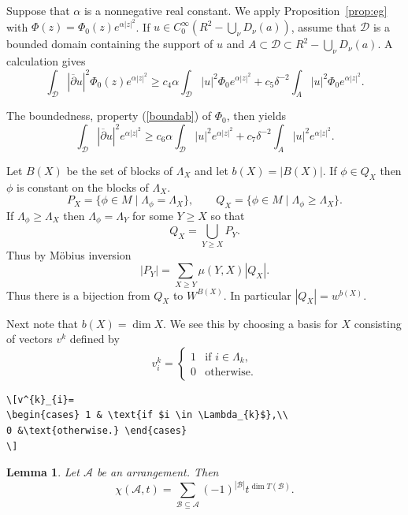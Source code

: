 \documentclass{article}
\newtheorem{lem}[thm]{Lemma}
\theoremstyle{definition}
\theoremstyle{remark}
\newcommand{\A}{\mathcal{A}}
\newcommand{\B}{\mathcal{B}}
\newcommand{\envert}[1]{\left\lvert#1\right\rvert}
\let\abs=\envert
\begin{document}
Suppose that $\alpha$ is a nonnegative real constant. We apply
Proposition~\ref{prop:eg} with $\Phi(z)=\Phi_ 0(z) e^{\alpha\abs{z}^2}$. If
$u\in C^\infty_0(R^2-\bigcup_\nu D_\nu(a))$, assume that $\mathcal{D}$
is a bounded domain containing the support of $u$ and $A\subset
\mathcal{D}\subset R^2-\bigcup_\nu D_\nu(a)$. A calculation gives
\[\int_{\mathcal{D}}\abs{\overline\partial u}^2\Phi_ 0(z) e^{\alpha\abs{z}^2}
\geq c_4\alpha\int_{\mathcal{D}}\abs{u}^2\Phi_ 0e^{\alpha\abs{z}^2}
+c_5\delta^{-2}\int_ A\abs{u}^2\Phi_ 0e^{\alpha\abs{z}^2}.\]

The boundedness, property (\ref{boundab}) of $\Phi_ 0$, then yields
\[\int_{\mathcal{D}}\abs{\overline\partial u}^2e^{\alpha\abs{z}^2}\geq c_6\alpha
\int_{\mathcal{D}}\abs{u}^2e^{\alpha\abs{z}^2}
+c_7\delta^{-2}\int_ A\abs{u}^2e^{\alpha\abs{z}^2}.\]

Let $B(X)$ be the set of blocks of $\Lambda_{X}$
and let $b(X) = \abs{B(X)}$. If $\phi \in Q_{X}$ then
$\phi$ is constant on the blocks of $\Lambda_{X}$.
\begin{equation}\label{far-d}
 P_{X} = \{ \phi \in M \mid \Lambda_{\phi} = \Lambda_{X} \},
\qquad
Q_{X} = \{\phi \in M \mid \Lambda_{\phi} \geq \Lambda_{X} \}.
\end{equation}
If $\Lambda_{\phi} \geq \Lambda_{X}$ then
$\Lambda_{\phi} = \Lambda_{Y}$ for some $Y \geq X$ so that
\[ Q_{X} = \bigcup_{Y \geq X} P_{Y}. \]
Thus by M\"obius inversion
\[ \abs{P_{Y}}= \sum_{X\geq Y} \mu (Y,X)\abs{Q_{X}}.\]
Thus there is a bijection from $Q_{X}$ to $W^{B(X)}$.
In particular $\abs{Q_{X}} = w^{b(X)}$.

Next note that $b(X)=\dim X$. We see this by choosing a
basis for $X$ consisting of vectors $v^{k}$ defined by
\[v^{k}_{i}=
\begin{cases} 1 & \text{if $i \in \Lambda_{k}$},\\
0 &\text{otherwise.} \end{cases}
\]
\begin{verbatim}
\[v^{k}_{i}=
\begin{cases} 1 & \text{if $i \in \Lambda_{k}$},\\
0 &\text{otherwise.} \end{cases}
\]
\end{verbatim}

\begin{lem}\label{p0201}
Let $\A$ be an arrangement. Then
\[ \chi (\A,t) = \sum_{\B \subseteq \A}
(-1)^{\abs{\B}} t^{\dim T(\B)}. \]
\end{lem}
\end{document}
